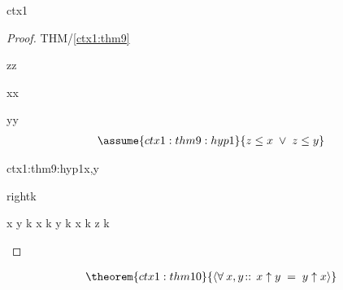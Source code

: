 \documentclass[12pt]{amsart}
\begin{document}
\begin{context}{ctx1}
\begin{proof}{THM/\ref{ctx1:thm9}}
	\begin{free:var}{z}{z}
	\begin{free:var}{x}{x}
	\begin{free:var}{y}{y}
	\begin{align}
	\assume{ctx1:thm9:hyp1}{ z \le x \1\lor z\le y } 
	\end{align}
\begin{by:symmetry}{ctx1:thm9:hyp1}{x,y}
\begin{indirect:inequality}{right}{\le}{k}
\begin{calculation}
		x \uparrow y \1\le k
	\hint{=}{ \eqref{ctx1:axm1} }
		x \le k \1\land y \le k
		x \le k
		z \le k
\end{calculation}
\end{indirect:inequality}
\end{by:symmetry}
	\end{free:var}
	\end{free:var}
	\end{free:var}
\end{proof}

\begin{align}
\theorem{ctx1:thm10}{ \qforall{x,y}{}{ x \uparrow y \1= y \uparrow x } }
\end{align}

\end{context}
\end{document}
